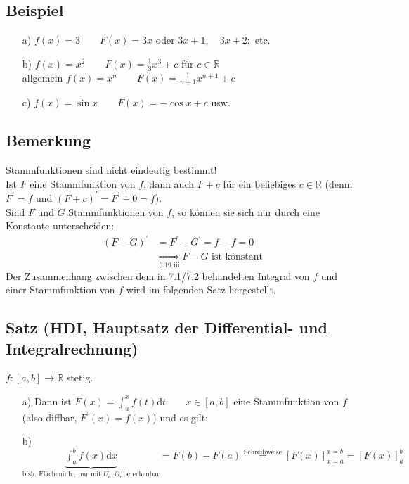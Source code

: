 \documentclass[12pt, titlepage]{article}
\newcommand{\R}{\mathds{R}}
\renewcommand{\>}{\rightarrow}
\renewcommand{\*}{\cdot}
\begin{document}
	\subsection{Beispiel}
	\begin{itemize}
		\item[a)] $f(x)=3\qquad F(x)=3x$ oder $3x+1;\quad3x+2;$ etc.
		\item[b)] $f(x)=x^2\qquad F(x)=\frac{1}{3}x^3+c$ für $c\in\R$\\
		allgemein $f(x)=x^n\qquad F(x)=\frac{1}{n+1}x^{n+1}+c$
		\item[c)] $f(x)=\sin x\qquad F(x)=-\cos x+c$ usw.
	\end{itemize}
	\subsection{Bemerkung}
	Stammfunktionen sind nicht eindeutig bestimmt!\\
	Ist $F$ eine Stammfunktion von $f$, dann auch $F+c$ für ein beliebiges $c\in\R$ (denn: $F^\prime=f$ und $(F+c)^\prime=F^\prime+0=f$).\\
	Sind $F$ und $G$ Stammfunktionen von $f$, so können sie sich nur durch eine Konstante unterscheiden:
	\begin{align*}
		(F-G)^\prime&=F^\prime-G^\prime=f-f=0\\
		&\underset{\textrm{6.19 iii}}{\Rightarrow} F-G\textrm{ ist konstant}
	\end{align*}
	Der Zusammenhang zwischen dem in 7.1/7.2 behandelten Integral von $f$ und einer Stammfunktion von $f$ wird im folgenden Satz hergestellt.
	\subsection{Satz (HDI, Hauptsatz der Differential- und Integralrechnung)}
	$f\colon[a,b]\>\R$ stetig.
	\begin{itemize}
		\item[a)] Dann ist $F(x)=\int_{a}^{x}f(t)\textrm{d}t\qquad x\in[a,b]$ eine Stammfunktion von $f$ (also diffbar, $F^\prime(x)=f(x)$) und es gilt:
		\item[b)] $\underbrace{\int_{a}^{b}f(x)\textrm{d}x}_{\textrm{bish. Flächeninh., nur mit } U_n, O_n \textrm{berechenbar}}=F(b)-F(a)\overset{\textrm{Schreibweise}}{=}[F(x)]^{x=b}_{x=a}=[F(x)]^b_a$
	\end{itemize}
\end{document}
